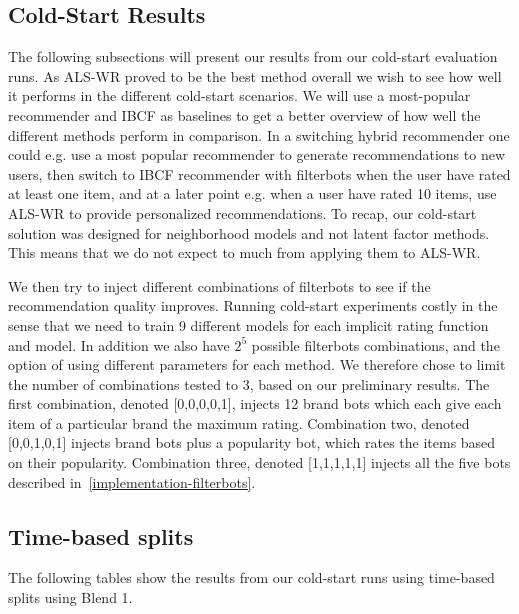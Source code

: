 \subsection{Cold-Start Results}

The following subsections will present our results from our cold-start evaluation runs. As ALS-WR proved to be the best method overall we wish to
see how well it performs in the different cold-start scenarios. We will use a most-popular recommender and IBCF as baselines to get a better
overview of how well the different methods perform in comparison. In a switching hybrid recommender one could e.g. use a most popular
recommender to generate recommendations to new users, then switch to IBCF recommender with filterbots when the user have rated at least one item, and at a later
point e.g. when a user have rated 10 items, use ALS-WR to provide personalized recommendations. To recap, our cold-start solution was designed
for neighborhood models and not latent factor methods. This means that we do not expect to much from applying them to ALS-WR.

We then try to inject different combinations of filterbots to see if the recommendation quality improves.
Running cold-start experiments costly in the sense that we need to train 9 different models for each implicit rating function and model.
In addition we also have $2^5$ possible filterbots combinations, and the option of using different parameters for each method. We therefore chose
to limit the number of combinations tested to 3, based on our preliminary results. The first combination, denoted [0,0,0,0,1], injects 12 brand
bots which each give each item of a particular brand the maximum rating. Combination two, denoted [0,0,1,0,1] injects brand bots plus a popularity bot, which rates
the items based on their popularity. Combination three, denoted [1,1,1,1,1] injects all the five bots described in~\ref{implementation-filterbots}.

\subsection{Time-based splits}

The following tables show the results from our cold-start runs using time-based splits using Blend 1.

